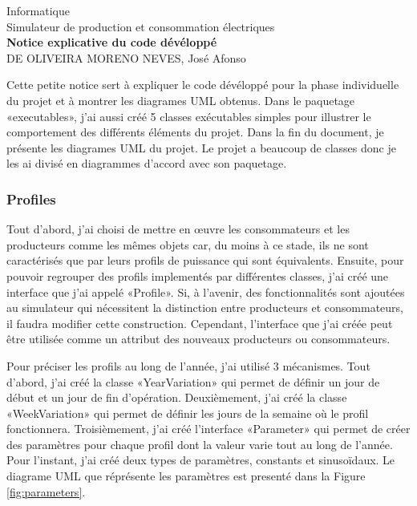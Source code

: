 \documentclass[11pt,a4paper,openany]{article}
\begin{document}
\thispagestyle{firstpage}

\begin{center}
	\large{
    Informatique\\
    Simulateur de production et consommation électriques \\
    \vspace{10pt}
    \textbf{Notice explicative du code dévéloppé} \\}
    \vspace{10pt}
    DE OLIVEIRA MORENO NEVES, José Afonso \\
\end{center}

Cette petite notice sert à expliquer le code dévéloppé pour la phase individuelle du projet et à montrer les diagrames UML obtenus. Dans le paquetage «executables», j'ai aussi créé 5 classes exécutables simples pour illustrer le comportement des différents éléments du projet. Dans la fin du document, je présente les diagrames UML du projet. Le projet a beaucoup de classes donc je les ai divisé en diagrammes d'accord avec son paquetage.

\subsubsection*{Profiles}

Tout d'abord, j'ai choisi de mettre en œuvre les consommateurs et les producteurs comme les mêmes objets car, du moins à ce stade, ils ne sont caractérisés que par leurs profils de puissance qui sont équivalents. Ensuite, pour pouvoir regrouper des profils implementés par différentes classes, j'ai créé une interface que j'ai appelé «Profile». Si, à l'avenir, des fonctionnalités sont ajoutées au simulateur qui nécessitent la distinction entre producteurs et consommateurs, il faudra modifier cette construction. Cependant, l'interface que j'ai créée peut être utilisée comme un attribut des nouveaux producteurs ou consommateurs.

Pour préciser les profils au long de l'année, j'ai utilisé 3 mécanismes. Tout d'abord, j'ai créé la classe «YearVariation» qui permet de définir un jour de début et un jour de fin d'opération. Deuxièmement, j'ai créé la classe «WeekVariation» qui permet de définir les jours de la semaine où le profil fonctionnera. Troisièmement, j'ai créé l'interface «Parameter» qui permet de créer des paramètres pour chaque profil dont la valeur varie tout au long de l'année. Pour l'instant, j'ai créé deux types de paramètres, constants et sinusoïdaux. Le diagrame UML que réprésente les paramètres est presenté dans la Figure \ref{fig:parameters}.
\end{document}

